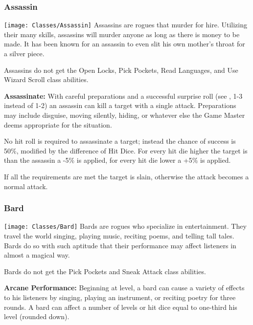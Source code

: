 \begin{multicols*}{2}
\subsubsection{Assassin}
\texttt{[image: Classes/Assassin]}
Assassins are rogues that murder for hire. Utilizing their many skills, assassins will murder anyone as long as there is money to be made. It has been known for an assassin to even slit his own mother’s throat for a silver piece.

Assassins do not get the Open Locks, Pick Pockets, Read Languages, and Use Wizard Scroll class abilities.

\textbf{Assassinate:} With careful preparations and a successful surprise roll (see , 1-3 instead of 1-2) an assassin can kill a target with a single attack. Preparations may include disguise, moving silently, hiding, or whatever else the Game Master deems appropriate for the situation.

No hit roll is required to assassinate a target; instead the chance of success is 50\%, modified by the difference of Hit Dice. For every hit die higher the target is than the assassin a -5\% is applied, for every hit die lower a +5\% is applied.

If all the requirements are met the target is slain, otherwise the attack becomes a normal attack.


\subsubsection{Bard}
\texttt{[image: Classes/Bard]}
Bards are rogues who specialize in entertainment. They travel the world singing, playing music, reciting poems, and telling tall tales. Bards do so with such aptitude that their performance may affect listeners in almost a magical way.

Bards do not get the Pick Pockets and Sneak Attack class abilities.

\textbf{Arcane Performance:} Beginning at  level, a bard can cause a variety of effects to his listeners by singing, playing an instrument, or reciting poetry for three rounds. A bard can affect a number of levels or hit dice equal to one-third his level (rounded down).


\end{multicols*}
